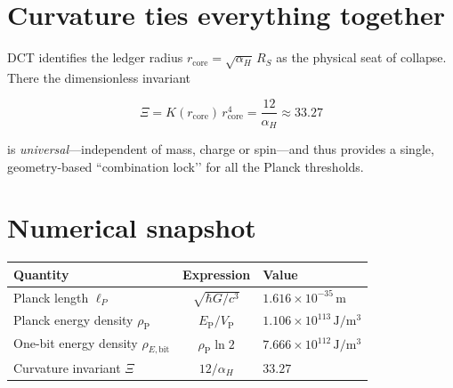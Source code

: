 \documentclass[a4paper, 12pt, oneside]{book}
\numberwithin{equation}{chapter}
\begin{document}
\section{Curvature ties everything together}
DCT identifies the ledger radius
\(r_{\text{core}}=\sqrt{\alpha_H}\,R_S\)  
as the physical seat of collapse.  There the dimensionless invariant

\[
\Xi = K(r_{\text{core}})\,r_{\text{core}}^{4}
     = \frac{12}{\alpha_H}
     \approx 33.27
\]

is \emph{universal}—independent of mass, charge or spin—and thus
provides a single, geometry-based “combination lock’’ for all the
Planck thresholds.

\section{Numerical snapshot}
\begin{center}
\renewcommand{\arraystretch}{1.25}
\setlength{\tabcolsep}{7pt}
\begin{tabular}{lcl}
\toprule
Quantity & Expression & Value \\ \midrule
Planck length \(\ell_P\) & \(\sqrt{\hbar G/c^{3}}\) & \(1.616\times10^{-35}\,\mathrm m\)\\
Planck energy density \(\rho_{\mathrm P}\) & \(E_{\mathrm P}/V_{\mathrm P}\) & \(1.106\times10^{113}\,\mathrm{J/m^{3}}\)\\
One-bit energy density \(\rho_{E,\text{bit}}\) & \(\rho_{\mathrm P}\ln2\) & \(7.666\times10^{112}\,\mathrm{J/m^{3}}\)\\
Curvature invariant \(\Xi\) & \(12/\alpha_H\) & \(33.27\) \\ \bottomrule
\end{tabular}
\end{center}

\end{document}
